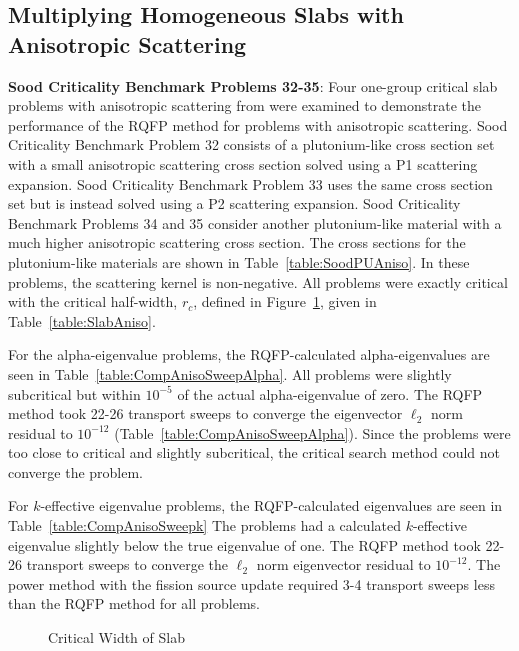 \subsection{Multiplying Homogeneous Slabs with Anisotropic Scattering}

\textbf{Sood Criticality Benchmark Problems 32-35}: Four one-group critical slab problems with anisotropic scattering from \cite{sood2003analytical} were examined to demonstrate the performance of the RQFP method for problems with anisotropic scattering. Sood Criticality Benchmark Problem 32 consists of a plutonium-like cross section set with a small anisotropic scattering cross section solved using a P1 scattering expansion. Sood Criticality Benchmark Problem 33 uses the same cross section set but is instead solved using a P2 scattering expansion. Sood Criticality Benchmark Problems 34 and 35 consider another plutonium-like material with a much higher anisotropic scattering cross section. The cross sections for the plutonium-like materials are shown in Table~\ref{table:SoodPUAniso}. In these problems, the scattering kernel is non-negative. All problems were exactly critical with the critical half-width, $r_{c}$, defined in Figure~\ref{fig:SlabCritWidth}, given in Table~\ref{table:SlabAniso}.

For the alpha-eigenvalue problems, the RQFP-calculated alpha-eigenvalues are seen in Table~\ref{table:CompAnisoSweepAlpha}. All problems were slightly subcritical but within $10^{-5}$ of the actual alpha-eigenvalue of zero. The RQFP method took 22-26 transport sweeps to converge the eigenvector $\ell_{2}$ norm residual to $10^{-12}$ (Table~\ref{table:CompAnisoSweepAlpha}). Since the problems were too close to critical and slightly subcritical, the critical search method could not converge the problem.

For $k$-effective eigenvalue problems, the RQFP-calculated eigenvalues are seen in Table~\ref{table:CompAnisoSweepk} The problems had a calculated $k$-effective eigenvalue slightly below the true eigenvalue of one. The RQFP method took 22-26 transport sweeps to converge the $\ell_{2}$ norm eigenvector residual to $10^{-12}$. The power method with the fission source update required 3-4 transport sweeps less than the RQFP method for all problems.

\begin{figure}[!htbp]
	\centering
	
	\caption{Critical Width of Slab}
	\label{fig:SlabCritWidth}
\end{figure}

